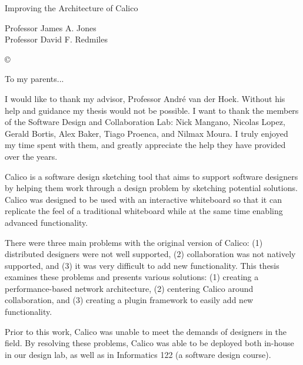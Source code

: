 \documentclass[12pt,fleqn]{ucithesis}
\begin{document}
\thesistitle
{
  Improving the Architecture of Calico
}




\othercommitteemembers
{
  Professor James A. Jones\\
  Professor David F. Redmiles
}


\copyrightdeclaration
{
  {\copyright} {\Degreeyear} \Authorname
}


\dedications
{
  To my parents...
}

\acknowledgments
{
  I would like to thank my advisor, Professor Andr\'{e} van der Hoek. Without his help and guidance my thesis would not be possible.
  I want to thank the members of the Software Design and Collaboration Lab: Nick Mangano, Nicolas Lopez, Gerald Bortis, Alex Baker, Tiago Proenca, and Nilmax Moura. I truly enjoyed my time spent with them, and greatly appreciate the help they have provided over the years.
}

\thesisabstract
{
  Calico is a software design sketching tool that aims to support software designers by helping them work through a design problem by sketching potential solutions. 
  Calico was designed to be used with an interactive whiteboard so that it can replicate the feel of a traditional whiteboard while at the same time enabling advanced functionality. 

  There were three main problems with the original version of Calico: 
  (1) distributed designers were not well supported, 
  (2) collaboration was not natively supported,
  and (3) it was very difficult to add new functionality.
  This thesis examines these problems and presents various solutions:
  (1) creating a performance-based network architecture,
  (2) centering Calico around collaboration,
  and (3) creating a plugin framework to easily add new functionality.

  Prior to this work, Calico was unable to meet the demands of designers in the field. By resolving these problems, Calico was able to be deployed both in-house in our design lab, as well as in Informatics 122 (a software design course).
}
\end{document}
